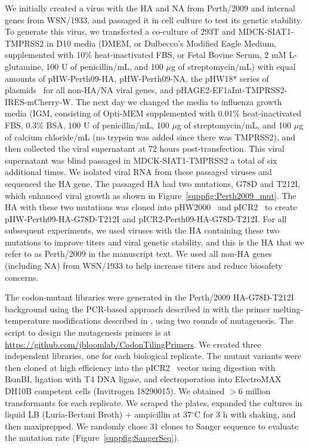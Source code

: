 \documentclass[9pt,twocolumn,twoside]{pnas-new}
\begin{document}
{We initially created a virus with the HA and NA from Perth/2009 and internal genes from WSN/1933, and passaged it in cell culture to test its genetic stability.
To generate this virus, we transfected a co-culture of 293T and MDCK-SIAT1-TMPRSS2 in D10 media (DMEM, or Dulbecco's Modified Eagle Medium, supplemented with 10\% heat-inactivated FBS, or Fetal Bovine Serum, 2 mM L-glutamine, 100 U of penicillin/mL, and 100 $\mu$g of streptomycin/mL) with equal amounts of pHW-Perth09-HA, pHW-Perth09-NA, the pHW18* series of plasmids~\cite{hoffmann2000dna} for all non-HA/NA viral genes, and pHAGE2-EF1aInt-TMPRSS2-IRES-mCherry-W.
The next day we changed the media to influenza growth media (IGM, consisting of Opti-MEM supplemented with 0.01\% heat-inactivated FBS, 0.3\% BSA, 100 U of penicillin/mL, 100 $\mu$g of streptomycin/mL, and 100 $\mu$g of calcium chloride/mL (no trypsin was added since there was TMPRSS2), and then collected the viral supernatant at 72 hours post-transfection.
This viral supernatant was blind passaged in MDCK-SIAT1-TMPRSS2 a total of six additional times.
We isolated viral RNA from these passaged viruses and sequenced the HA gene.
The passaged HA had two mutations, G78D and T212I, which enhanced viral growth as shown in Figure~\ref{suppfig:Perth2009_mut}.
The HA with these two mutations was cloned into pHW2000~\citep{hoffmann2000dna} and pICR2~\cite{ashenberg2017deep} to create pHW-Perth09-HA-G78D-T212I and pICR2-Perth09-HA-G78D-T212I.
For all subsequent experiments, we used viruses with the HA containing these two mutations to improve titers and viral genetic stability, and this is the HA that we refer to as Perth/2009 in the manuscript text.
We used all non-HA genes (including NA) from WSN/1933 to help increase titers and reduce biosafety concerns.

The codon-mutant libraries were generated in the Perth/2009 HA-G78D-T212I background using the PCR-based approach described in \cite{bloom2014experimentally} with the primer melting-temperature modifications described in \cite{dingens2017comprehensive}, using two rounds of mutagenesis.
The script to design the mutagenesis primers is at \url{https://github.com/jbloomlab/CodonTilingPrimers}.
We created three independent libraries, one for each biological replicate.
The mutant variants were then cloned at high efficiency into the pICR2~\cite{ashenberg2017deep} vector using digestion with BsmBI, ligation with T4 DNA ligase, and electroporation into ElectroMAX DH10B competent cells (Invitrogen 18290015).
We obtained $>$6 million transformants for each replicate.
We scraped the plates, expanded the cultures in liquid LB (Luria-Bertani Broth) + ampicillin at 37$^{\circ}$C for 3 h with shaking, and then maxiprepped.
We randomly chose 31 clones to Sanger sequence to evaluate the mutation rate (Figure~\ref{suppfig:SangerSeq}).

}
\end{document}
